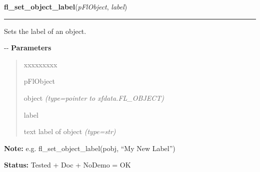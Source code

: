 \hspace{.8\funcindent}\begin{boxedminipage}{\funcwidth}

    \raggedright \textbf{fl\_set\_object\_label}(\textit{pFlObject}, \textit{label})

    \vspace{-1.5ex}

    \rule{\textwidth}{0.5\fboxrule}
\setlength{\parskip}{2ex}

Sets the label of an object.

-{}-
\setlength{\parskip}{1ex}
      \textbf{Parameters}
      \vspace{-1ex}

      \begin{quote}
        \begin{Ventry}{xxxxxxxxx}

          \item[pFlObject]


object
            {\it (type=pointer to xfdata.FL\_OBJECT)}

          \item[label]


text label of object
            {\it (type=str)}

        \end{Ventry}

      \end{quote}

\textbf{Note:} 
e.g. fl\_set\_object\_label(pobj, ``My New Label'')


\textbf{Status:} 
Tested + Doc + NoDemo = OK


    \end{boxedminipage}

    \label{xformslib:flbasic:fl_get_object_label}

    \vspace{0.5ex}

